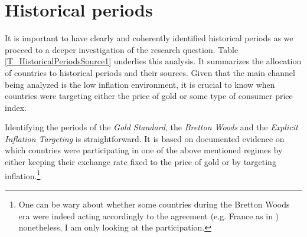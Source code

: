 \documentclass[12pt]{article}
\newcommand{\annote}[1]{\parbox{\textwidth}{\renewcommand{\baselinestretch}{1.0}\vspace{12pt} \footnotesize Notes: #1}}
\begin{document}
\begin{appendices}
\begin{singlespace}

\end{singlespace}

\clearpage

\setcounter{table}{0}
\setcounter{figure}{0}

\section{Historical periods} \label{SS_HistoricalPeriods}

It is important to have clearly and coherently identified historical periods as we proceed to a deeper investigation of the research question. Table \ref{T_HistoricalPeriodsSource1} underlies this analysis. It summarizes the allocation of countries to historical periods and their sources. Given that the main channel being analyzed is the low inflation environment, it is crucial to know when countries were targeting either the price of gold or some type of consumer price index.

Identifying the periods of the \textit{Gold Standard}, the \textit{Bretton Woods} and the \textit{Explicit Inflation Targeting} is straightforward. It is based on documented evidence on which countries were participating in one of the above mentioned regimes by either keeping their exchange rate fixed to the price of gold or by targeting inflation.\footnote{One can be wary about whether some countries during the Bretton Woods era were indeed acting accordingly to the agreement (e.g. France as in \cite{Bordo1995}) nonetheless, I am only looking at the participation.}


\end{appendices}
\end{document}
